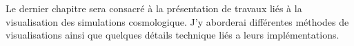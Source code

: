 Le dernier chapitre sera consacré à la présentation de travaux liés à la visualisation des simulations cosmologique.
J'y aborderai différentes méthodes de visualisations ainsi que quelques détails technique liés a leurs implémentations.



%

%
%

%
%
%
%
